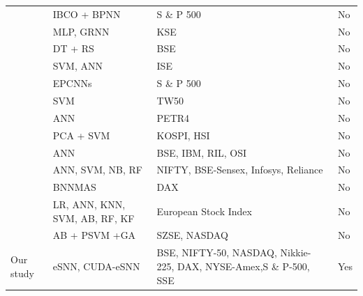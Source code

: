 \begin{table}
{\begin{tabular}{llll}
			\citep{zhang2009stock}   & IBCO + BPNN                                         & S \& P 500                                                        & No        \\
			\citep{mostafa2010forecasting}   & MLP, GRNN                                           & KSE                                                               & No        \\
			\citep{nair2010decision}   & DT + RS                                             & BSE                                                               & No        \\
			\citep{kara2011predicting}   & SVM, ANN                                            & ISE                                                               & No        \\
			\citep{chang2012novel}   & EPCNNs                                              & S \& P 500                                                        & No        \\
			\citep{lin2013svm}   & SVM                                                 & TW50                                                              & No        \\
			\citep{de2013applying}   & ANN                                                 & PETR4                                                             & No        \\
			\citep{wang2014stock}   & PCA  + SVM                                          & KOSPI, HSI                                                        & No        \\
			\citep{bisoi2014hybrid}   & ANN                                                 & BSE, IBM, RIL, OSI                                                & No        \\
			\citep{patel2015predicting}    & ANN, SVM, NB, RF                                    & NIFTY, BSE-Sensex, Infosys, Reliance                              & No        \\
			\citep{hafezi2015bat}   & BNNMAS                                              & DAX                                                               & No        \\
			\citep{ballings2015evaluating}    & LR, ANN, KNN, SVM, AB, RF, KF                       & European Stock Index                                              & No        \\
			\citep{zhang2016stock}    & AB + PSVM +GA                                       & SZSE, NASDAQ                                                      & No        \\
			Our study & eSNN, CUDA-eSNN                                     & BSE, NIFTY-50, NASDAQ, Nikkie-225, DAX, NYSE-Amex,S \& P-500, SSE & Yes \\
			\bottomrule[1.25pt]     
	\end{tabular}}
\end{table}

